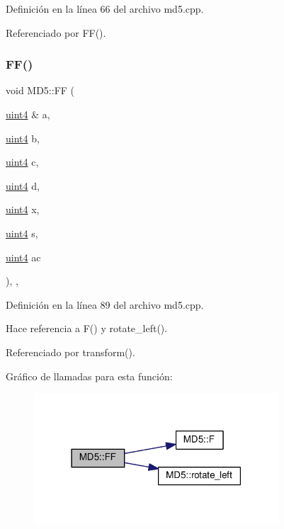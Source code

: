 Definición en la línea 66 del archivo md5.\+cpp.



Referenciado por F\+F().

\hypertarget{classMD5_a31479b157441ace2dbc2ae0edd0d2e38}{}\label{classMD5_a31479b157441ace2dbc2ae0edd0d2e38} 
\subsubsection{\texorpdfstring{F\+F()}{FF()}}
{\footnotesize\ttfamily void M\+D5\+::\+FF (\begin{DoxyParamCaption}\item[{\hyperlink{classMD5_a2e5b84a3d7db292f49873061214a0444}{uint4} \&}]{a,  }\item[{\hyperlink{classMD5_a2e5b84a3d7db292f49873061214a0444}{uint4}}]{b,  }\item[{\hyperlink{classMD5_a2e5b84a3d7db292f49873061214a0444}{uint4}}]{c,  }\item[{\hyperlink{classMD5_a2e5b84a3d7db292f49873061214a0444}{uint4}}]{d,  }\item[{\hyperlink{classMD5_a2e5b84a3d7db292f49873061214a0444}{uint4}}]{x,  }\item[{\hyperlink{classMD5_a2e5b84a3d7db292f49873061214a0444}{uint4}}]{s,  }\item[{\hyperlink{classMD5_a2e5b84a3d7db292f49873061214a0444}{uint4}}]{ac }\end{DoxyParamCaption})\hspace{0.3cm}{\ttfamily [inline]}, {\ttfamily [static]}, {\ttfamily [private]}}



Definición en la línea 89 del archivo md5.\+cpp.



Hace referencia a F() y rotate\+\_\+left().



Referenciado por transform().

Gráfico de llamadas para esta función\+:\nopagebreak
\begin{figure}[H]
\begin{center}
\leavevmode
\includegraphics[width=259pt]{classMD5_a31479b157441ace2dbc2ae0edd0d2e38_cgraph}
\end{center}
\end{figure}
\hypertarget{classMD5_a10f607494a3f2e3e515fc4b99d1a06cc}{}\label{classMD5_a10f607494a3f2e3e515fc4b99d1a06cc} 

